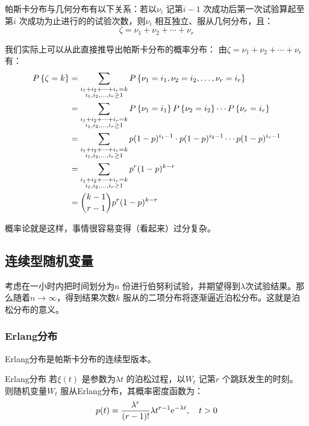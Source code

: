 
帕斯卡分布与几何分布有以下关系：若以\(\nu_{i}\) 记第\(i-1\) 次成功后第一次试验算起至第\(i\)
次成功为止进行的的试验次数，则\(\nu_{i}\) 相互独立、服从几何分布，且：
\[
    \zeta = \nu_{1} + \nu_{2} + \cdots + \nu_{r}
\]

我们实际上可以从此直接推导出帕斯卡分布的概率分布：
由\(\zeta = \nu_{1} + \nu_{2} + \cdots + \nu_{r}\) 有：
\begin{align*}
    \P{\zeta=k} &=
    \sum_{\substack{i_{1}+i_{2}+\dots +i_{r}=k
    \\ i_{1},i_{2},\ldots,i_{r}\geq 1}} \P{\nu_{1}=i_{1},
    \nu_{2}=i_{2}, \ldots, \nu_{r}=i_{r}} \\
    &=\sum_{\substack{i_{1}+i_{2}+\dots +i_{r}=k
    \\ i_{1},i_{2},\ldots,i_{r}\geq 1}} P\left\{
    \nu_{1}=i_{1}\right\} \P{ \nu_{2}=i_{2} }
    \cdots \P{ \nu_{r}=i_{r} } \\
    &= \sum_{\substack{i_{1}+i_{2}+\dots +i_{r}=k
    \\ i_{1},i_{2},\ldots,i_{r}\geq 1}} p(1-p)^{i_{1}-1}
    \cdot p(1-p)^{i_{2}-1} \cdots p(1-p)^{i_{r}-1} \\
    &= \sum_{\substack{i_{1}+i_{2}+\dots +i_{r}=k
    \\ i_{1},i_{2},\ldots,i_{r}\geq 1}} p^{r} (1-p)^{k-r} \\
    &= \binom{k-1}{r-1} p^{r} (1-p)^{k-r}
\end{align*}

概率论就是这样，事情很容易变得（看起来）过分复杂。

\subsection{连续型随机变量}
考虑在一小时内把时间划分为\(n\) 份进行伯努利试验，并期望得到\(\lambda\)次试验结果。那么随着\(n
\to \infty\)，得到结果次数\(k\) 服从的二项分布将逐渐逼近泊松分布。这就是泊松分布的意义。

\subsubsection{Erlang分布} Erlang分布是帕斯卡分布的连续型版本。
\begin{definition}{Erlang分布}
    若\(\xi(t)\) 是参数为\(\lambda t\) 的泊松过程，以\(W_{t}\) 记第\(r\) 个跳跃发生的时刻。
    则随机变量\(W_{t}\) 服从Erlang分布，其概率密度函数为：
    \[
        p(t) = \frac{\lambda^{r}}{(r-1)!} \lambda t^{r-1}
        \e^{-\lambda t},
        \quad t>0
    \]
\end{definition}

